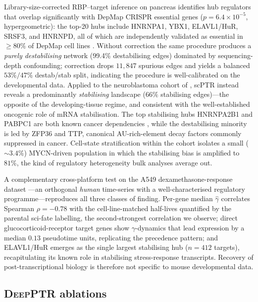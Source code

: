 \documentclass{article}
\begin{document}
Library-size-corrected RBP--target inference on pancreas identifies hub
regulators that overlap significantly with DepMap CRISPR essential genes
($p{=}6.4{\times}10^{-5}$, hypergeometric): the top-20 hubs include
HNRNPA1, YBX1, ELAVL1/HuR, SRSF3, and HNRNPD, all of which are
independently validated as essential in $\geq 80\%$ of DepMap cell lines
\citep{dempster2021}. Without correction the same procedure produces a
\emph{purely destabilising} network (99.4\% destabilising edges)
dominated by sequencing-depth confounding; correction drops $11{,}847$
spurious edges and yields a balanced $53\%/47\%$ destab/stab split,
indicating the procedure is well-calibrated on the developmental data.
Applied to the neuroblastoma cohort of \citet{dong2020}, scPTR instead
reveals a predominantly \emph{stabilising} landscape ($66\%$ stabilising
edges)---the opposite of the developing-tissue regime, and consistent
with the well-established oncogenic role of mRNA stabilisation. The top
stabilising hubs HNRNPA2B1 and PABPC1 are both known cancer dependencies
\citep{dempster2021}, while the destabilising minority is led by ZFP36
and TTP, canonical AU-rich-element decay factors commonly suppressed in
cancer. Cell-state stratification within the cohort isolates a small
($\sim 3.4\%$) MYCN-driven population in which the stabilising bias is
amplified to $81\%$, the kind of regulatory heterogeneity bulk analyses
average out.

A complementary cross-platform test on the A549 dexamethasone-response
dataset \citep{cao2020}---an orthogonal \emph{human} time-series with a
well-characterised regulatory programme---reproduces all three classes of
finding. Per-gene median $\widehat\gamma$ correlates Spearman
$\rho{=}{-}0.78$ with the cell-line-matched half-lives quantified by the
parental sci-fate labelling, the second-strongest correlation we observe;
direct glucocorticoid-receptor target genes show $\gamma$-dynamics that
lead expression by a median $0.13$ pseudotime units, replicating the
precedence pattern; and ELAVL1/HuR emerges as the single largest
stabilising hub ($n{=}412$ targets), recapitulating its known role in
stabilising stress-response transcripts. Recovery of post-transcriptional
biology is therefore not specific to mouse developmental data.

\subsection{\textsc{DeepPTR} ablations}
\end{document}
